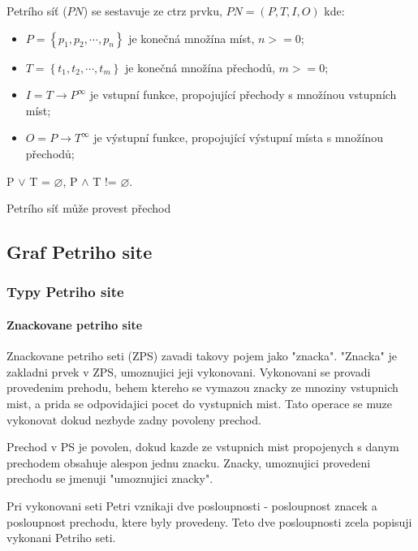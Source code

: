 Petrího síť ($PN$) se sestavuje ze ctrz prvku, $PN = \left(P, T, I, O\right)$ kde:
  \begin{itemize}
    \item $P = \left\{p_1, p_2, \cdots , p_n\right\}$ je konečná množína míst, $n >= 0$; \\
    \item $T = \left\{t_1, t_2, \cdots , t_m\right\}$ je konečná množína přechodů, $m >= 0$; \\
    \item $I = T \rightarrow P^\infty$ je vstupní funkce, propojující přechody s množínou vstupních míst; \\
    \item $O = P \rightarrow T^\infty$ je výstupní funkce, propojující výstupní místa s množínou přechodů; \\
  \end{itemize}
P $\vee$ T = $\varnothing$, P $\wedge$ T != $\varnothing$. 

Petrího síť může provest přechod 

\subsection*{Graf Petriho site}

\subsubsection{Typy Petriho site}

\paragraph*{Znackovane petriho site}
Znackovane petriho seti (ZPS) zavadi takovy pojem jako "znacka". "Znacka" je zakladni prvek v ZPS, umoznujici jeji vykonovani. Vykonovani se provadi provedenim prehodu, behem ktereho se vymazou znacky ze mnoziny vstupnich mist, a prida se odpovidajici pocet do vystupnich mist. Tato operace se muze vykonovat dokud nezbyde zadny povoleny prechod.

Prechod v PS je povolen, dokud kazde ze vstupnich mist propojenych s danym prechodem obsahuje alespon jednu znacku. Znacky, umoznujici provedeni prechodu se jmenuji "umoznujici znacky".

Pri vykonovani seti Petri vznikaji dve posloupnosti - posloupnost znacek a posloupnost prechodu, ktere byly provedeny. Teto dve posloupnosti zcela popisuji vykonani Petriho seti.

